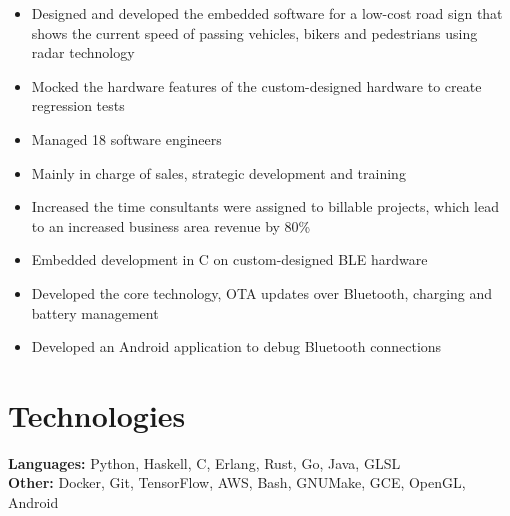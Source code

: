 \documentclass{cv_doc}
\begin{document}

\begin{itemize}[label={\tiny\raisebox{1ex}{\textbullet}}]
  \item {Designed and developed the embedded software for a low-cost road sign
  that shows the current speed of passing vehicles, bikers and pedestrians
  using radar technology}
  \item {Mocked the hardware features of the custom-designed hardware to create
  regression tests}
\end{itemize}


\begin{itemize}[label={\tiny\raisebox{1ex}{\textbullet}}]
  \item {Managed 18 software engineers}
  \item {Mainly in charge of sales, strategic development and training}
  \item {Increased the time consultants were assigned to billable projects,
  which lead to an increased business area revenue by 80\%}
\end{itemize}


\begin{itemize}[label={\tiny\raisebox{1ex}{\textbullet}}]
  \item {Embedded development in C on custom-designed BLE hardware}
  \item {Developed the core technology, OTA updates over Bluetooth, charging
  and battery management}
  \item {Developed an Android application to debug Bluetooth connections}
\end{itemize}

\section*{Technologies}

\textbf{Languages:} Python, Haskell, C, Erlang, Rust, Go, Java, GLSL \\
\textbf{Other:} Docker, Git, TensorFlow, AWS, Bash, GNUMake, GCE, OpenGL,
Android
\end{document}
